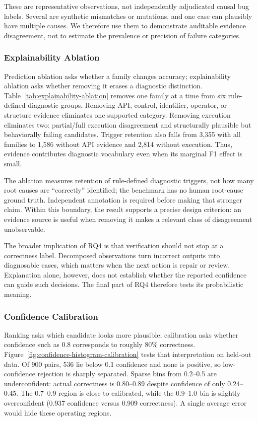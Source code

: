 ﻿\documentclass[conference]{IEEEtran}
\begin{document}

These are representative observations, not independently adjudicated causal bug labels. Several are synthetic mismatches or mutations, and one case can plausibly have multiple causes. We therefore use them to demonstrate auditable evidence disagreement, not to estimate the prevalence or precision of failure categories.

\subsubsection{Explainability Ablation}
Prediction ablation asks whether a family changes accuracy; explainability ablation asks whether removing it erases a diagnostic distinction. Table~\ref{tab:explainability-ablation} removes one family at a time from six rule-defined diagnostic groups. Removing API, control, identifier, operator, or structure evidence eliminates one supported category. Removing execution eliminates two: partial/full execution disagreement and structurally plausible but behaviorally failing candidates. Trigger retention also falls from 3,355 with all families to 1,586 without API evidence and 2,814 without execution. Thus, evidence contributes diagnostic vocabulary even when its marginal F1 effect is small.


The ablation measures retention of rule-defined diagnostic triggers, not how many root causes are ``correctly'' identified; the benchmark has no human root-cause ground truth. Independent annotation is required before making that stronger claim. Within this boundary, the result supports a precise design criterion: an evidence source is useful when removing it makes a relevant class of disagreement unobservable.

The broader implication of RQ4 is that verification should not stop at a correctness label. Decomposed observations turn incorrect outputs into diagnosable cases, which matters when the next action is repair or review. Explanation alone, however, does not establish whether the reported confidence can guide such decisions. The final part of RQ4 therefore tests its probabilistic meaning.

\subsubsection{Confidence Calibration}
Ranking asks which candidate looks more plausible; calibration asks whether confidence such as 0.8 corresponds to roughly 80\% correctness. Figure~\ref{fig:confidence-histogram-calibration} tests that interpretation on held-out data. Of 900 pairs, 536 lie below 0.1 confidence and none is positive, so low-confidence rejection is sharply separated. Sparse bins from 0.2--0.5 are underconfident: actual correctness is 0.80--0.89 despite confidence of only 0.24--0.45. The 0.7--0.9 region is close to calibrated, while the 0.9--1.0 bin is slightly overconfident (0.937 confidence versus 0.909 correctness). A single average error would hide these operating regions.
\end{document}
